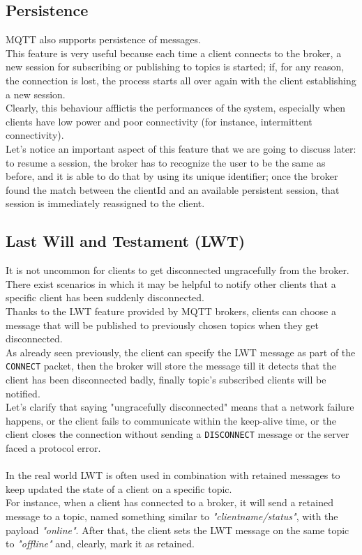 \documentclass[12pt]{report}
\begin{document}
{\subsection{Persistence}
\bigskip
MQTT also supports persistence of messages.\\
This feature is very useful because each time a client connects to the broker, a new session for subscribing or publishing to topics is started; if, for any reason, the connection is lost, the process starts all over again with the client establishing a new session.\\
Clearly, this behaviour afflictis the performances of the system, especially when clients have low power and poor connectivity (for instance, intermittent connectivity).\\
Let's notice an important aspect of this feature that we are going to discuss later: to resume a session, the broker has to recognize the user to be the same as before, and it is able to do that by using its unique identifier; once the broker found the match between the clientId and an available persistent session, that session is immediately reassigned to the client.\\

\subsection{Last Will and Testament (LWT)}
\bigskip
It is not uncommon for clients to get disconnected ungracefully from the broker.\\
There exist scenarios in which it may be helpful to notify other clients that a specific client has been suddenly disconnected.\\
Thanks to the LWT feature provided by MQTT brokers, clients can choose a message that will be published to previously chosen topics when they get disconnected.\\
As already seen previously, the client can specify the LWT message as part of the \texttt{CONNECT} packet, then the broker will store the message till it detects that the client has been disconnected badly, finally topic's subscribed clients will be notified.\\
Let's clarify that saying "ungracefully disconnected" means that a network failure happens, or the client fails to communicate within the keep-alive time, or the client closes the connection without sending a \texttt{DISCONNECT} message or the server faced a protocol error.\\\\
In the real world LWT is often used in combination with retained messages to keep updated the state of a client on a specific topic.\\
For instance, when a client has connected to a broker, it will send a retained message to a topic, named something similar to \emph{"clientname/status"}, with the payload \emph{"online"}.
After that, the client sets the LWT message on the same topic to \emph{"offline"} and, clearly, mark it as retained.



}
\end{document}
